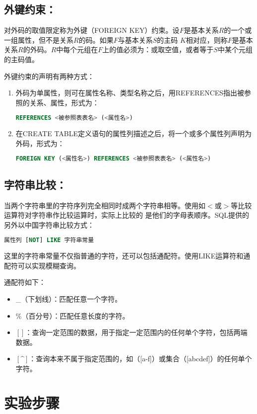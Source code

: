 \documentclass[a4paper]{uestcreport}
\begin{document}
\subsection{外键约束：}
对外码的取值限定称为外键（FOREIGN KEY）约束。设$F$是基本关系$R$的一个或一组属性，但不是关系$R$的码。如果$F$与基本关系$S$的主码
$K$相对应，则称$F$是基本关系$R$的外码。$R$中每个元组在$F$上的值必须为：或取空值，或者等于$S$中某个元组的主码值。

外键约束的声明有两种方式：
\begin{enumerate}
    \item 外码为单属性，则可在属性名称、类型名称之后，用REFERENCES指出被参照的关系、属性，形式为：
          \begin{lstlisting}[language=SQL]
        REFERENCES <被参照表表名> (<属性名>)
    \end{lstlisting}
    \item 在CREATE TABLE定义语句的属性列描述之后，将一个或多个属性列声明为外码，形式为：
          \begin{lstlisting}[language=SQL]
        FOREIGN KEY (<属性名>) REFERENCES <被参照表表名> (<属性名>)
    \end{lstlisting}
\end{enumerate}

\subsection{字符串比较：}
当两个字符串里的字符序列完全相同时成两个字符串相等。使用如$<$或$>$等比较运算符对字符串作比较运算时，实际上比较的
是他们的字母表顺序。SQL提供的另外以中国字符串比较方式：
\begin{lstlisting}[language=SQL]
    属性列 [NOT] LIKE 字符串常量
\end{lstlisting}

这里的字符串常量不仅指普通的字符，还可以包括通配符。使用LIKE运算符和通配符可以实现模糊查询。

通配符如下：
\begin{itemize}
    \item \_（下划线）：匹配任意一个字符。
    \item \%（百分号）：匹配任意长度的字符。
    \item $[]$：查询一定范围的数据，用于指定一定范围内的任何单个字符，包括两端数据。
    \item $[\^{}]$：查询本来不属于指定范围的，如（[a-f]）或集合（[abcdef]）的任何单个字符。
\end{itemize}

\section{实验步骤}
\end{document}
